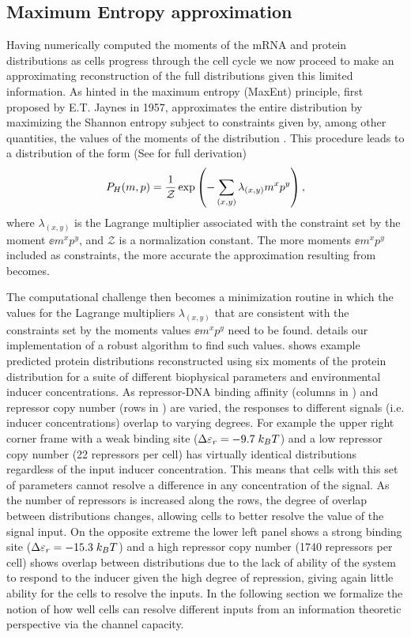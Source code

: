 \subsection{Maximum Entropy approximation}\label{sec_maxent}

Having numerically computed the moments of the mRNA and protein distributions as
cells progress through the cell cycle we now proceed to make an approximating
reconstruction of the full distributions given this limited information. As
hinted in  the maximum entropy (MaxEnt) principle, first
proposed by E.T. Jaynes in 1957, approximates the entire distribution by
maximizing the Shannon entropy subject to constraints given by, among other
quantities, the values of the moments of the distribution \cite{Jaynes1957}.
This procedure leads to a distribution of the form (See  for
full derivation)
\begin{equation}
  P_H(m, p) = {1 \over \mathcal{Z}}
              \exp \left( - \sum_{(x,y)} \lambda_{(x,y)} m^x p^y \right),
  \label{eq_maxEnt_joint}
\end{equation}
where $\lambda_{(x,y)}$ is the Lagrange multiplier associated with the
constraint set by the moment $\ee{m^x p^y}$, and $\mathcal{Z}$ is a
normalization constant. The more moments $\ee{m^x p^y}$ included as constraints,
the more accurate the approximation resulting from 
becomes.

The computational challenge then becomes a minimization routine in which the
values for the Lagrange multipliers $\lambda_{(x,y)}$ that are consistent with
the constraints set by the moments values $\ee{m^x p^y}$ need to be found.
 details our implementation of a robust algorithm to find
such values.  shows example predicted protein distributions
reconstructed using six moments of the protein distribution for a suite of
different biophysical parameters and environmental inducer concentrations. As
repressor-DNA binding affinity (columns in ) and repressor
copy number (rows in ) are varied, the responses to different
signals (i.e. inducer concentrations) overlap to varying degrees. For example
the upper right corner frame with a weak binding site ($\Delta\varepsilon_r = -9.7 \; k_BT$) and
a low repressor copy number (22 repressors per cell) has virtually identical
distributions regardless of the input inducer concentration. This means that
cells with this set of parameters cannot resolve a difference in any
concentration of the signal. As the number of repressors is increased along the
rows, the degree of overlap between distributions changes, allowing cells to
better resolve the value of the signal input. On the opposite extreme the lower
left panel shows a strong binding site ($\Delta\varepsilon_r = -15.3 \; k_BT$) and a high
repressor copy number (1740 repressors per cell) shows overlap between
distributions due to the lack of ability of the system to respond to the inducer
given the high degree of repression, giving again little ability for the cells
to resolve the inputs. In the following section we formalize the notion of how
well cells can resolve different inputs from an information theoretic
perspective via the channel capacity.

